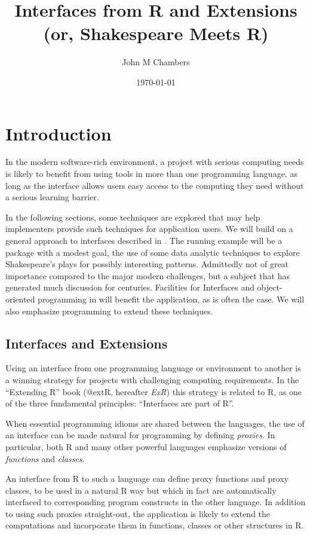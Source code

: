 \documentclass{article}
\title{ Interfaces from R and Extensions \\ (or, Shakespeare
  Meets R)}
\author{John M Chambers}
\date{\today}
\begin{document}
\maketitle


\section{Introduction}
\label{sec:introduction}

In the modern software-rich environment, a project with serious
computing needs is likely to benefit from using tools in more than one
programming language, as long as the interface allows users easy
access to the computing they need without a serious learning barrier.

In the following sections, some techniques are explored that may help
implementers provide such techniques for application users.
We will build on a general approach to interfaces described in
\cite{extR}.
The running example will be a package with a modest goal, the use of
some data analytic techniques to explore Shakespeare's plays for
possibly interesting patterns.
Admittedly not of great importance compared to the major modern
challenges, but a subject that has generated much discussion for
centuries.
Facilities for Interfaces and object-oriented programming in \R{} will
benefit the application, as is often the case.  We will also emphasize programming to extend
these techniques.

\subsection{Interfaces and Extensions}\label{interfaces-and-extensions}

Using an interface from one programming language or environment to
another is a winning strategy for projects with challenging computing
requirements. In the ``Extending R'' book (@extR, hereafter \emph{ExR})
this strategy is related to R, as one of the three fundamental
principles: ``Interfaces are part of R''.

When essential programming idioms are shared between the languages, the
use of an interface can be made natural for programming by defining
\emph{proxies}. In particular, both R and many other powerful languages
emphasize versions of \emph{functions} and \emph{classes}.

An interface from R to such a language can define proxy functions and
proxy classes, to be used in a natural R way but which in fact are
automatically interfaced to corresponding program constructs in the
other language. In addition to using such proxies straight-out, the
application is likely to extend the computations and incorporate them in
functions, classes or other structures in R.
\end{document}
